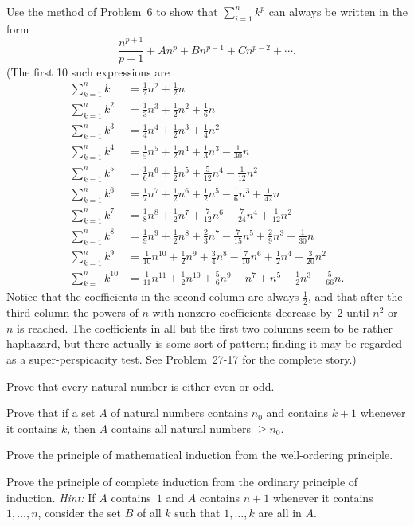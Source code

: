  Use the method of Problem~6 to show that $\sum_{i=1}^{n} k^p$ can
always be written in the form
\[ \frac{n^{p+1}}{p+1} + A n^p + B n^{p-1} + C n^{p-2} + \cdots. \]
(The first 10 such expressions are
\begin{align*}
\sum_{k=1}^{n} k
  &= \tfrac12 n^2 + \tfrac12 n\\
\sum_{k=1}^{n} k^2
  &= \tfrac13 n^3 + \tfrac12 n^2 + \tfrac16 n\\
\sum_{k=1}^{n} k^3
  &= \tfrac14 n^4 + \tfrac12 n^3 + \tfrac14 n^2\\
\sum_{k=1}^{n} k^4
  &= \tfrac15 n^5 + \tfrac12 n^4 + \tfrac13 n^3 - \tfrac1{30} n\\
\sum_{k=1}^{n} k^5
  &= \tfrac16 n^6 + \tfrac12 n^5 + \tfrac5{12} n^4 - \tfrac1{12} n^2\\
\sum_{k=1}^{n} k^6
  &= \tfrac17 n^7 + \tfrac12 n^6 + \tfrac12 n^5 - \tfrac16 n^3 + \tfrac1{42} n\\
\sum_{k=1}^{n} k^7
  &= \tfrac18 n^8 + \tfrac12 n^7 + \tfrac7{12} n^6 - \tfrac7{24} n^4
     + \tfrac1{12} n^2\\
\sum_{k=1}^{n} k^8
  &= \tfrac19 n^9 + \tfrac12 n^8 + \tfrac23 n^7 - \tfrac7{15} n^5
     + \tfrac29 n^3 - \tfrac1{30} n\\
\sum_{k=1}^{n} k^9
  &= \tfrac1{10} n^{10} + \tfrac12 n^9 + \tfrac34 n^8 - \tfrac7{10} n^6
     + \tfrac12 n^4 - \tfrac3{20} n^2\\
\sum_{k=1}^{n} k^{10}
  &= \tfrac1{11} n^{11} + \tfrac12 n^{10} + \tfrac56 n^9 - n^7 + n^5
     - \tfrac12 n^3 + \tfrac5{66} n.
\end{align*}
Notice that the coefficients in the second column are always $\tfrac12$, and
that after the third column the powers of $n$ with nonzero coefficients
decrease by~$2$ until $n^2$ or $n$ is reached. The coefficients in all but
the first two columns seem to be rather haphazard, but there actually is some
sort of pattern; finding it may be regarded as a super-perspicacity test. See
Problem~27-17 for the complete story.)

 Prove that every natural number is either even or odd.

 Prove that if a set $A$ of natural numbers contains $n_0$ and
contains $k+1$ whenever it contains $k$, then $A$ contains all natural
numbers $\geq n_0$.

 Prove the principle of mathematical induction from the well-ordering
principle.

 Prove the principle of complete induction from the ordinary
principle of induction. \textit{Hint:} If $A$ contains~$1$ and $A$ contains
$n+1$ whenever it contains $1, \dots, n$, consider the set $B$ of all $k$
such that $1, \dots, k$ are all in $A$.

